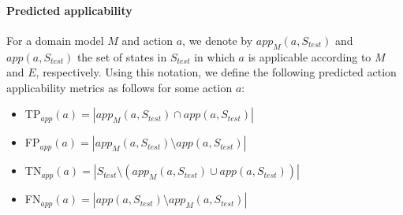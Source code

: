 \documentclass[letterpaper]{article} %
\newcommand{\app}{\ensuremath{\textit{app}}\xspace}
\newcommand{\stest}{\ensuremath{S_{\textit{test}}}\xspace}
\newif\ifaddcomments
\newcommand{\roni}[1]{\ifaddcomments{\textcolor{red}{[Roni: #1]}}\fi}
\newcommand{\gregor}[1]{\ifaddcomments{\textcolor{orange}{[Gregor: #1]}}\fi}
\newcommand{\leo}[1]{\ifaddcomments{\textcolor{pink}{[Leonardo: #1]}}\fi}
\newcommand{\pascalJr}[1]{\ifaddcomments{\textcolor{cyan}{[Pascal L.: {#1}]}}\fi}
\begin{document}
\paragraph{Predicted applicability}
For a domain model $M$ and action $a$, we denote by $\app_M(a,\stest)$ and $\app(a,\stest)$ the set of states in \stest 
in which $a$ is applicable according to $M$ and $E$, respectively. 
Using this notation, we define the following predicted action applicability metrics as follows for some action $a$:
\begin{itemize}
    \item TP$_{\app}(a)=|\app_M(a,\stest)\cap \app(a,\stest)|$
    \item FP$_{\app}(a)=|\app_M(a,\stest)\setminus \app(a,\stest)|$ 
    \item TN$_{\app}(a)=|\stest\setminus (\app_M(a,\stest)\cup \app(a,\stest))|$
    \item FN$_{\app}(a)=|\app(a,\stest)\setminus \app_M(a,\stest)|$
\end{itemize}
\end{document}
